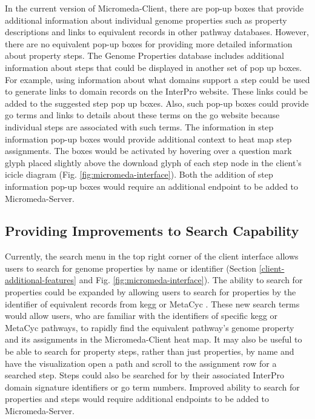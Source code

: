 In the current version of Micromeda-Client, there are pop-up boxes that provide additional information about individual genome properties such as property descriptions and links to equivalent records in other pathway databases. However, there are no equivalent pop-up boxes for providing more detailed information about property steps. The Genome Properties database includes additional information about steps that could be displayed in another set of pop up boxes. For example, using information about what domains support a step could be used to generate links to domain records on the InterPro website. These links could be added to the suggested step pop up boxes. Also, such pop-up boxes could provide \gls{go} terms and links to details about these terms on the \gls{go} website because individual steps are associated with such terms. The information in step information pop-up boxes would provide additional context to heat map step assignments. The boxes would be activated by hovering over a question mark glyph placed slightly above the download glyph of each step node in the client's icicle diagram (Fig. \ref{fig:micromeda-interface}). Both the addition of step information pop-up boxes would require an additional endpoint to be added to Micromeda-Server.

\subsection{Providing Improvements to Search Capability}

Currently, the search menu in the top right corner of the client interface allows users to search for genome properties by name or identifier (Section \ref{client-additional-features} and Fig. \ref{fig:micromeda-interface}). The ability to search for properties could be expanded by allowing users to search for properties by the identifier of equivalent records from \gls{kegg} \cite{kanehisa2000kegg} or MetaCyc \cite{karp2002metacyc}. These new search terms would allow users, who are familiar with the identifiers of specific \gls{kegg} or MetaCyc pathways, to rapidly find the equivalent pathway's genome property and its assignments in the Micromeda-Client heat map. It may also be useful to be able to search for property steps, rather than just properties, by name and have the visualization open a path and scroll to the assignment row for a searched step. Steps could also be searched for by their associated InterPro domain signature identifiers or \gls{go} term numbers. Improved ability to search for properties and steps would require additional endpoints to be added to Micromeda-Server.

